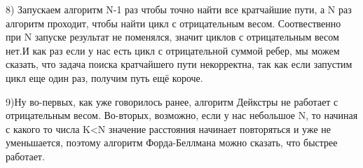 \documentclass{article}
\begin{document}
{8) Запускаем алгоритм N-1 раз чтобы точно найти все кратчайшие пути, а N раз алгоритм проходит, чтобы найти цикл с отрицательным весом. Соотвественно при N запуске результат не поменялся, значит циклов с отрицательным весом нет.И как раз если у нас есть цикл с  отрицательной суммой ребер, мы можем сказать, что задача поиска кратчайшего пути некорректна, так как если запустим цикл еще один раз, получим путь ещё короче.

9)Ну во-первых, как уже говорилось ранее, алгоритм Дейкстры не работает с отрицательным весом. Во-вторых, возможно, если у нас небольшое N, то начиная с какого то числа K<N значение расстояния начинает повторяться и уже не уменьшается, поэтому алгоритм Форда-Беллмана можно сказать, что быстрее работает.




}
\end{document}
